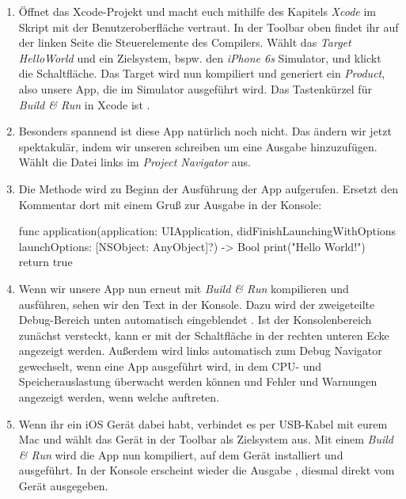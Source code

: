 \documentclass[parskip=half, final]{scrreprt}
\begin{document}
\begin{lecture}
\begin{enumerate}
\item Öffnet das Xcode-Projekt  und macht euch mithilfe des Kapitels \emph{Xcode} im Skript mit der Benutzeroberfläche vertraut. In der Toolbar oben findet ihr auf der linken Seite die Steuerelemente des Compilers. Wählt das \emph{Target} \emph{HelloWorld} und ein Zielsystem, bspw. den \emph{iPhone 6s} Simulator, und klickt die  Schaltfläche. Das Target wird nun kompiliert und generiert ein \emph{Product}, also unsere App, die im Simulator ausgeführt wird. Das Tastenkürzel für \emph{Build \& Run} in Xcode ist .

\item Besonders spannend ist diese App natürlich noch nicht. Das ändern wir jetzt spektakulär, indem wir unseren  schreiben um eine Ausgabe hinzuzufügen. Wählt die Datei  links im \emph{Project Navigator} aus.

\item Die Methode  wird zu Beginn der Ausführung der App aufgerufen. Ersetzt den Kommentar dort mit einem Gruß zur Ausgabe in der Konsole:

\begin{swiftcode}
func application(application: UIApplication, didFinishLaunchingWithOptions launchOptions: [NSObject: AnyObject]?) -> Bool {
    print("Hello World!")
    return true
}
\end{swiftcode}

\item Wenn wir unsere App nun erneut mit \emph{Build \& Run}  kompilieren und ausführen, sehen wir den Text  in der Konsole. Dazu wird der zweigeteilte Debug-Bereich unten automatisch eingeblendet . Ist der Konsolenbereich zunächst versteckt, kann er mit der Schaltfläche in der rechten unteren Ecke angezeigt werden. Außerdem wird links automatisch zum Debug Navigator gewechselt, wenn eine App ausgeführt wird, in dem CPU- und Speicherauslastung überwacht werden können und Fehler und Warnungen angezeigt werden, wenn welche auftreten.


\item Wenn ihr ein iOS Gerät dabei habt, verbindet es per USB-Kabel mit eurem Mac und wählt das Gerät in der Toolbar als Zielsystem aus. Mit einem \emph{Build \& Run} wird die App nun kompiliert, auf dem Gerät installiert und ausgeführt. In der Konsole erscheint wieder die Ausgabe , diesmal direkt vom Gerät ausgegeben.


\end{enumerate}
\end{lecture}
\end{document}
